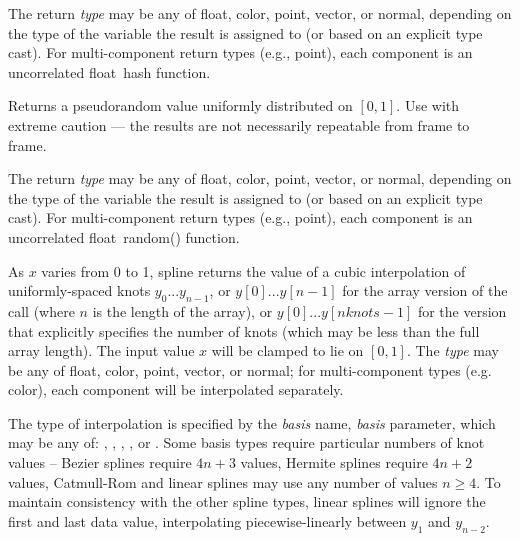 \documentclass[11pt,letterpaper]{book}
\def\color{{\cf color}\xspace}
\def\float{{\cf float}\xspace}
\def\normal{{\cf normal}\xspace}
\def\point{{\cf point}\xspace}
\def\vector{{\cf vector}\xspace}
\begin{document}
The return \emph{type} may be any of \float, \color, \point, \vector, or
\normal, depending on the type of the variable the result is assigned to
(or based on an explicit type cast).  For multi-component return types
(e.g., \point), each component is an uncorrelated \float\ {\cf hash}
function.
\apiend

Returns a pseudorandom value uniformly distributed on $[0,1]$.  Use with
extreme caution --- the results are not necessarily repeatable from
frame to frame.

The return \emph{type} may be any of \float, \color, \point, \vector, or
\normal, depending on the type of the variable the result is assigned to
(or based on an explicit type cast).  For multi-component return types
(e.g., \point), each component is an uncorrelated \float\ {\cf random()}
function.
\apiend



As $x$ varies from 0 to 1, {\cf spline} returns the value of a cubic
interpolation of uniformly-spaced knots $y_0$...$y_{n-1}$, or
$y[0]$...$y[n-1]$ for the array version of the call (where $n$ is the
length of the array), or $y[0]$...$y[nknots-1]$ for the version that
explicitly specifies the number of knots (which may be less than the
full array length).  The input value $x$ will be clamped to lie
on $[0,1]$.  The \emph{type} may be any of \float, \color,
\point, \vector, or \normal; for multi-component types (e.g. \color),
each component will be interpolated separately.

The type of interpolation is specified by the \emph{basis} name,
\emph{basis} parameter, which may be any of: ,
, , , or .  Some basis
types require particular numbers of knot values -- Bezier splines
require $4n+3$ values, Hermite splines require $4n+2$ values,
Catmull-Rom and linear splines may use any number of values $n\ge 4$.
To maintain consistency with the other spline types, linear splines will
ignore the first and last data value, interpolating piecewise-linearly
between $y_1$ and $y_{n-2}$.
\apiend
\end{document}
